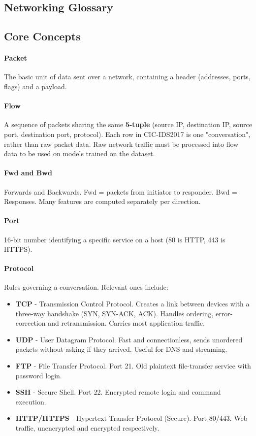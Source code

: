 \documentclass{article}
\begin{document}
\begin{appendices}
\section{Networking Glossary}
\subsection{Core Concepts}
\paragraph{Packet} The basic unit of data sent over a network, containing a header (addresses, ports, flags) and a payload.
\paragraph{Flow} A sequence of packets sharing the same \textbf{5-tuple} (source IP, destination IP, source port, destination port, protocol). Each row in CIC-IDS2017 is one "conversation", rather than raw packet data. Raw network traffic must be processed into flow data to be used on models trained on the dataset.
\paragraph{Fwd and Bwd} Forwards and Backwards. Fwd = packets from initiator to responder. Bwd = Responses. Many features are computed separately per direction.
\paragraph{Port} 16-bit number identifying a specific service on a host (80 is HTTP, 443 is HTTPS).
\paragraph{Protocol} Rules governing a conversation. Relevant ones include:
\begin{itemize}
  \item \textbf{TCP} - Transmission Control Protocol. Creates a link between devices with a three-way handshake (SYN, SYN-ACK, ACK). Handles ordering, error-correction and retransmission. Carries most application traffic.
  \item \textbf{UDP} - User Datagram Protocol. Fast and connectionless, sends unordered packets without asking if they arrived. Useful for DNS and streaming.
  \item \textbf{FTP} - File Transfer Protocol. Port 21. Old plaintext file-transfer service with password login.
  \item \textbf{SSH} - Secure Shell. Port 22. Encrypted remote login and command execution.
  \item \textbf{HTTP/HTTPS} - Hypertext Transfer Protocol (Secure). Port 80/443. Web traffic, unencrypted and encrypted respectively.
\end{itemize}

\end{appendices}
\end{document}
